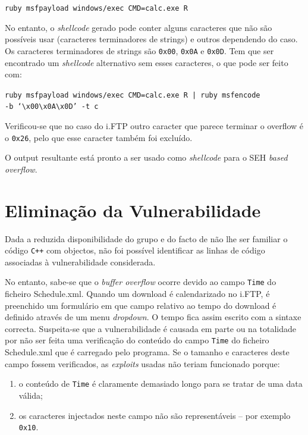 \documentclass[a4paper]{article}
\begin{document}
	\texttt{ruby msfpayload windows/exec CMD=calc.exe R}

No entanto, o \textit{shellcode} gerado pode conter alguns caracteres que não são possíveis usar (caracteres terminadores de strings) e outros dependendo do caso. Os caracteres terminadores de strings são \texttt{0x00}, \texttt{0x0A} e \texttt{0x0D}. Tem que ser encontrado um \textit{shellcode} alternativo sem esses caracteres, o que pode ser feito com:

	\texttt{ruby msfpayload windows/exec CMD=calc.exe R | ruby msfencode \\ -b `\textbackslash x00\textbackslash x0A\textbackslash x0D' -t c}

Verificou-se que no caso do i.FTP outro caracter que parece terminar o overflow é o \texttt{0x26}, pelo que esse caracter também foi excluído.

O output resultante está pronto a ser usado como \textit{shellcode} para o SEH \textit{based overflow}.


\section{Eliminação da Vulnerabilidade}

Dada a reduzida disponibilidade do grupo e do facto de não lhe ser familiar o código \texttt{C++} com objectos, não foi possível identificar as linhas de código associadas à vulnerabilidade considerada.

No entanto, sabe-se que o \textit{buffer overflow} ocorre devido ao campo \texttt{Time} do ficheiro Schedule.xml. Quando um download é calendarizado no i.FTP, é preenchido um formulário em que campo relativo ao tempo do download é definido através de um menu \textit{dropdown}. O tempo fica assim escrito com a sintaxe correcta. Suspeita-se que a vulnerabilidade é causada em parte ou na totalidade por não ser feita uma verificação do conteúdo do campo \texttt{Time} do ficheiro Schedule.xml que é carregado pelo programa. Se o tamanho e caracteres deste campo fossem verificados, as \textit{exploits} usadas não teriam funcionado porque:

\begin{enumerate}
	\item o conteúdo de \texttt{Time} é claramente demasiado longo para se tratar de uma data válida;
	\item os caracteres injectados neste campo não são representáveis -- por exemplo \texttt{0x10}.
\end{enumerate}
\end{document}
